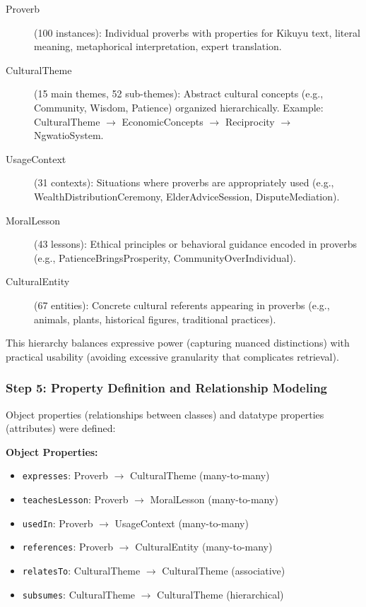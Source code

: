 \begin{description}
    \item[Proverb] (100 instances): Individual proverbs with properties for Kikuyu text, literal meaning, metaphorical interpretation, expert translation.
    
    \item[CulturalTheme] (15 main themes, 52 sub-themes): Abstract cultural concepts (e.g., Community, Wisdom, Patience) organized hierarchically. Example: CulturalTheme $\rightarrow$ EconomicConcepts $\rightarrow$ Reciprocity $\rightarrow$ NgwatioSystem.
    
    \item[UsageContext] (31 contexts): Situations where proverbs are appropriately used (e.g., WealthDistributionCeremony, ElderAdviceSession, DisputeMediation).
    
    \item[MoralLesson] (43 lessons): Ethical principles or behavioral guidance encoded in proverbs (e.g., PatienceBringsProsperity, CommunityOverIndividual).
    
    \item[CulturalEntity] (67 entities): Concrete cultural referents appearing in proverbs (e.g., animals, plants, historical figures, traditional practices).
\end{description}

This hierarchy balances expressive power (capturing nuanced distinctions) with practical usability (avoiding excessive granularity that complicates retrieval).

\subsubsection{Step 5: Property Definition and Relationship Modeling}
\label{subsubsec:property_definition}

Object properties (relationships between classes) and datatype properties (attributes) were defined:

\textbf{Object Properties:}
\begin{itemize}
    \item \texttt{expresses}: Proverb $\rightarrow$ CulturalTheme (many-to-many)
    \item \texttt{teachesLesson}: Proverb $\rightarrow$ MoralLesson (many-to-many)
    \item \texttt{usedIn}: Proverb $\rightarrow$ UsageContext (many-to-many)
    \item \texttt{references}: Proverb $\rightarrow$ CulturalEntity (many-to-many)
    \item \texttt{relatesTo}: CulturalTheme $\rightarrow$ CulturalTheme (associative)
    \item \texttt{subsumes}: CulturalTheme $\rightarrow$ CulturalTheme (hierarchical)
\end{itemize}


